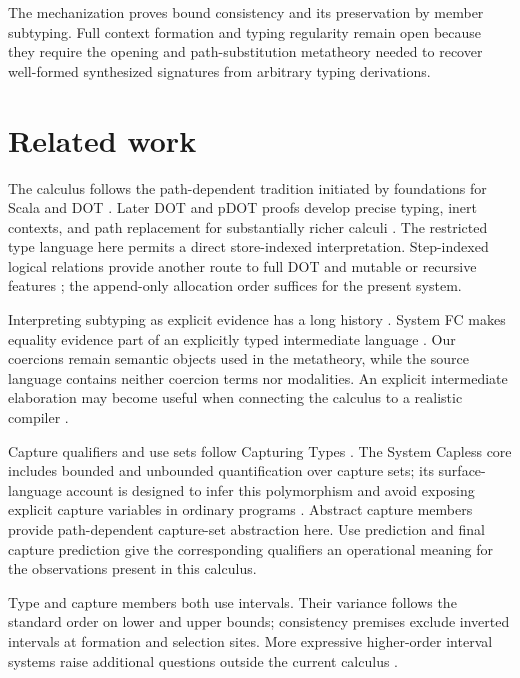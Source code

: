 \documentclass[acmsmall,screen,nonacm]{acmart}
\begin{document}
The mechanization proves bound consistency and its preservation by member
subtyping.  Full context formation and typing regularity remain open because
they require the opening and path-substitution metatheory needed to recover
well-formed synthesized signatures from arbitrary typing derivations.

\section{Related work}

The calculus follows the path-dependent tradition initiated by foundations
for Scala and DOT \citep{amin2014foundations,rompf2016dot}.  Later DOT and
pDOT proofs develop precise typing, inert contexts, and path replacement for
substantially richer calculi
\citep{rapoport2017simple,rapoport2019pdot}.  The restricted type language
here permits a direct store-indexed interpretation.  Step-indexed logical
relations provide another route to full DOT and mutable or recursive
features \citep{giarrusso2020gdot}; the append-only allocation order suffices
for the present system.

Interpreting subtyping as explicit evidence has a long history
\citep{breazutannen1991coercion,crary2000inclusive}.  System FC makes equality
evidence part of an explicitly typed intermediate language
\citep{sulzmann2007systemfc}.  Our coercions remain semantic objects used in
the metatheory, while the source language contains neither coercion terms nor
modalities.  An explicit intermediate elaboration may become useful when
connecting the calculus to a realistic compiler
\citep{martres2023compilation}.

Capture qualifiers and use sets follow Capturing Types
\citep{boruch2023capture}.  The System Capless core includes bounded and
unbounded quantification over capture sets; its surface-language account is
designed to infer this polymorphism and avoid exposing explicit capture
variables in ordinary programs \citep{xu2025box}.  Abstract capture members
provide path-dependent capture-set abstraction here.  Use prediction and
final capture prediction give the corresponding qualifiers an operational
meaning for the observations present in this calculus.

Type and capture members both use intervals.  Their variance follows the
standard order on lower and upper bounds; consistency premises exclude
inverted intervals at formation and selection sites.  More expressive
higher-order interval systems raise additional questions outside the current
calculus \citep{stucki2021intervals}.
\end{document}
